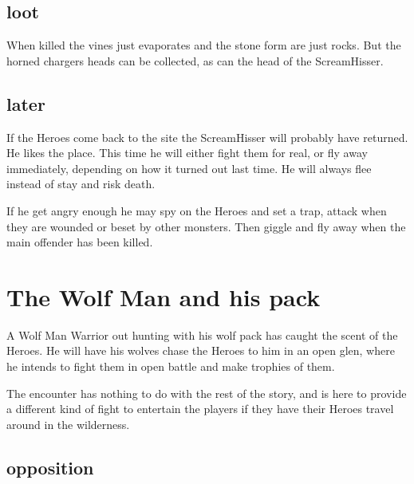 \subsection*{loot}
When killed the vines just evaporates and the stone form are just rocks. But the horned chargers heads can be collected, as can the head of the ScreamHisser.


\subsection*{later}
If the Heroes come back to the site the ScreamHisser will probably have returned. He likes the place. This time he will either fight them for real, or fly away immediately, depending on how it turned out last time. He will always flee instead of stay and risk death.

If he get angry enough he may spy on the Heroes and set a trap, attack when they are wounded or beset by other monsters. Then giggle and fly away when the main offender has been killed.









\section*{The Wolf Man and his pack}
A Wolf Man Warrior out hunting with his wolf pack has caught the scent of the Heroes. He will have his wolves chase the Heroes to him in an open glen, where he intends to fight them in open battle and make trophies of them.

The encounter has nothing to do with the rest of the story, and is here to provide a different kind of fight to entertain the players if they have their Heroes travel around in the wilderness.


\subsection*{opposition}




